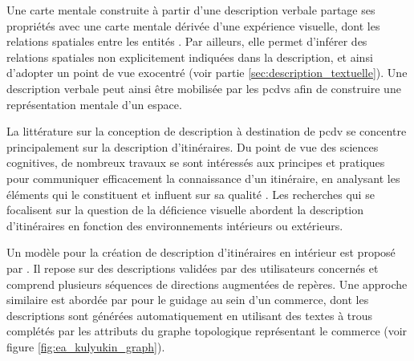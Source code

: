 


Une carte mentale construite à partir d'une description verbale partage ses propriétés avec une carte mentale dérivée d'une expérience visuelle, dont les relations spatiales entre les entités \citep{Denis1992}. Par ailleurs, elle permet d'inférer des relations spatiales non explicitement indiquées dans la description, et ainsi d'adopter un point de vue exocentré \citep{Avraamides2004} (voir partie \ref{sec:description_textuelle}). Une description verbale peut ainsi être mobilisée par les \glspl{pcdv} afin de construire une représentation mentale d'un espace.

\newpar{}


La littérature sur la conception de description à destination de \gls{pcdv} se concentre principalement sur la description d'itinéraires. Du point de vue des sciences cognitives, de nombreux travaux se sont intéressés aux principes et pratiques pour communiquer efficacement la connaissance d’un itinéraire, en analysant les éléments qui le constituent et influent sur sa qualité \citep{Allen2000,Lovelace1999}. Les recherches qui se focalisent sur la question de la déficience visuelle abordent la description d'itinéraires en fonction des environnements intérieurs ou extérieurs.

\newpar{}

Un modèle pour la création de description d'itinéraires en intérieur est proposé par \citet{Troeger2020}. Il repose sur des descriptions validées par des utilisateurs concernés et comprend plusieurs séquences de directions augmentées de repères. Une approche similaire est abordée par \citet{Kulyukin2008} pour le guidage au sein d'un commerce, dont les descriptions sont générées automatiquement en utilisant des textes à trous complétés par les attributs du graphe topologique représentant le commerce (voir figure \ref{fig:ea_kulyukin_graph}).

